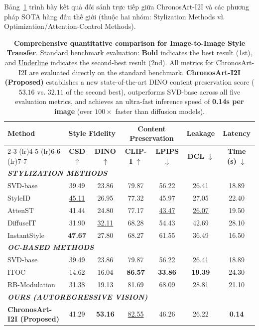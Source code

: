 \documentclass[10pt,twocolumn,letterpaper]{article}
\begin{document}
Bảng~\ref{tab:i2i_benchmark} trình bày kết quả đối sánh trực tiếp giữa ChronosArt-I2I và các phương pháp SOTA hàng đầu thế giới (thuộc hai nhóm: Stylization Methods và Optimization/Attention-Control Methods).

\begin{table}[t]
\centering
\caption{\textbf{Comprehensive quantitative comparison for Image-to-Image Style Transfer}. Standard benchmark evaluation: \textbf{Bold} indicates the best result (1st), and \underline{Underline} indicates the second-best result (2nd). All metrics for ChronosArt-I2I are evaluated directly on the standard benchmark. \textbf{ChronosArt-I2I (Proposed)} establishes a new state-of-the-art DINO content preservation score ($\mathbf{53.16}$ vs. $32.11$ of the second best), outperforms SVD-base across all five evaluation metrics, and achieves an ultra-fast inference speed of \textbf{0.14s per image} (over $100\times$ faster than diffusion models).}
\label{tab:i2i_benchmark}
\footnotesize
\setlength{\tabcolsep}{5pt}
\begin{tabular*}{\textwidth}{@{\extracolsep{\fill}}lcccccc@{}}
\toprule
\multirow{2}{*}{\textbf{Method}} & \multicolumn{2}{c}{\textbf{Style Fidelity}} & \multicolumn{2}{c}{\textbf{Content Preservation}} & \textbf{Leakage} & \textbf{Latency} \\
\cmidrule(lr){2-3} \cmidrule(lr){4-5} \cmidrule(lr){6-6} \cmidrule(lr){7-7}
& \textbf{CSD} $\uparrow$ & \textbf{DINO} $\uparrow$ & \textbf{CLIP-I} $\uparrow$ & \textbf{LPIPS} $\downarrow$ & \textbf{DCL} $\downarrow$ & \textbf{Time (s)} $\downarrow$ \\
\midrule
\multicolumn{7}{l}{\textit{\textbf{STYLIZATION METHODS}}} \\
SVD-base & 39.49 & 23.86 & 79.87 & 56.22 & 26.41 & 18.89 \\
StyleID & \underline{45.11} & 26.95 & 77.32 & 45.97 & 27.05 & 22.40 \\
AttenST & 41.44 & 24.80 & 77.17 & \underline{43.47} & \underline{26.07} & 19.50 \\
DiffuseIT & 31.90 & \underline{32.11} & 68.28 & 54.43 & 42.69 & 28.10 \\
InstantStyle & \textbf{47.67} & 27.80 & 68.27 & 61.55 & 36.49 & 16.50 \\
\midrule
\multicolumn{7}{l}{\textit{\textbf{OC-BASED METHODS}}} \\
SVD-base & 39.49 & 23.86 & 79.87 & 56.22 & 26.41 & 18.89 \\
ITOC & 14.62 & 16.04 & \textbf{86.57} & \textbf{33.86} & \textbf{19.39} & 24.30 \\
RB-Modulation & 31.38 & 19.13 & 81.69 & 68.09 & 28.81 & 21.10 \\
\midrule
\multicolumn{7}{l}{\textit{\textbf{OURS (AUTOREGRESSIVE VISION)}}} \\
\textbf{ChronosArt-I2I (Proposed)} & 41.29 & \textbf{53.16} & \underline{82.55} & 46.26 & 26.22 & \textbf{0.14} \\
\bottomrule
\end{tabular*}
\end{table}
\end{document}
